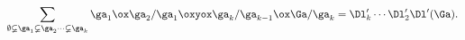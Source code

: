 \begin{equation}
\sum_{\emptyset\varsubsetneq\ga_1 \varsubsetneq\ga_2
\cdots\varsubsetneq\ga_k}
\ga_1 \ox \ga_2/\ga_1 \oxyox \ga_k/\ga_{k-1} \ox \Ga/\ga_k
= \Dl'_k \cdots \Dl'_2 \Dl'(\Ga).
\label{eq:foldup}%
\end{equation}

